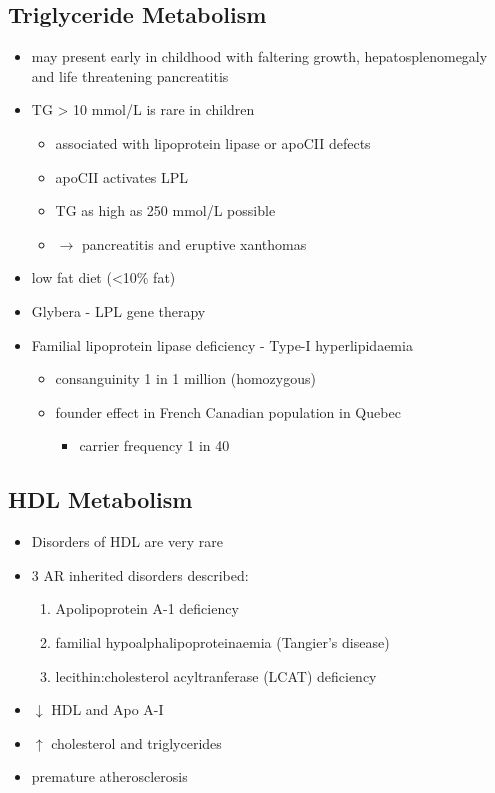 \documentclass{scrartcl}
\begin{document}
\subsection{Triglyceride Metabolism}
\label{sec:org1287dc6}
\begin{itemize}
\item may present early in childhood with faltering growth,
hepatosplenomegaly and life threatening pancreatitis
\item TG \textgreater{} 10 mmol/L is rare in children
\begin{itemize}
\item associated with lipoprotein lipase or apoCII defects
\item apoCII activates LPL
\item TG as high as 250 mmol/L possible
\item \(\to\) pancreatitis and eruptive xanthomas
\end{itemize}
\item low fat diet (<10\% fat)
\item Glybera - LPL gene therapy
\item Familial lipoprotein lipase deficiency - Type-I hyperlipidaemia
\begin{itemize}
\item consanguinity 1 in 1 million (homozygous)
\item founder effect in French Canadian population in Quebec
\begin{itemize}
\item carrier frequency 1 in 40
\end{itemize}
\end{itemize}
\end{itemize}
\subsection{HDL Metabolism}
\label{sec:orgc14f42c}
\begin{itemize}
\item Disorders of HDL are very rare
\item 3 AR inherited disorders described:
\begin{enumerate}
\item Apolipoprotein A-1 deficiency
\item familial hypoalphalipoproteinaemia (Tangier’s disease)
\item lecithin:cholesterol acyltranferase (LCAT) deficiency
\end{enumerate}
\item \(\downarrow\) HDL and Apo A-I
\item \(\uparrow\) cholesterol and triglycerides
\item premature atherosclerosis
\end{itemize}
\end{document}
